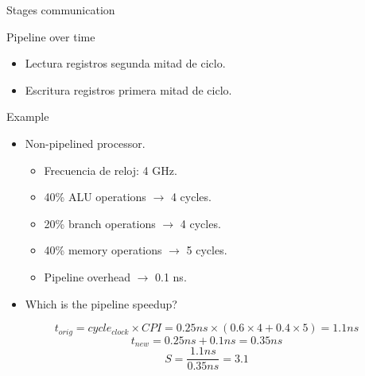 \begin{frame}[t]{Stages communication}

\end{frame}

\begin{frame}[t]{Pipeline over time}

\begin{itemize}
  \item Lectura registros segunda mitad de ciclo.
  \item Escritura registros primera mitad de ciclo.
\end{itemize}
\end{frame}

\begin{frame}[t]{Example}
\begin{itemize}
  \item Non-pipelined processor.
    \begin{itemize}
      \item Frecuencia de reloj: 4 GHz.
      \item 40\% ALU operations $\rightarrow$ 4 cycles.
      \item 20\% branch operations $\rightarrow$ 4 cycles.
      \item 40\% memory operations $\rightarrow$ 5 cycles.
      \item Pipeline overhead $\rightarrow$ 0.1 ns.
    \end{itemize}
  \item Which is the pipeline speedup?
\end{itemize}
\[
t_{orig} = cycle_{clock} \times CPI = 0.25 ns \times (0.6 \times 4 + 0.4 \times 5) = 1.1 ns
\]
\[
t_{new} = 0.25 ns + 0.1 ns = 0.35 ns
\]
\[
S = \frac{1.1 ns}{0.35 ns} = 3.1
\]
\end{frame}
